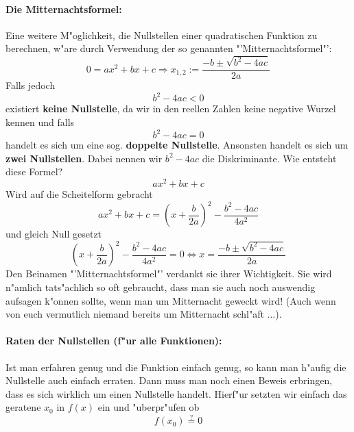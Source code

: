 \paragraph{Die Mitternachtsformel:}
Eine weitere M"oglichkeit, die Nullstellen einer quadratischen Funktion zu berechnen, w"are durch Verwendung der so genannten "'Mitternachtsformel"':
\begin{equation*}
0 = ax^2 + bx + c \Rightarrow x_{1,2} := \frac{-b \pm \sqrt{b^2 - 4ac}}{2a}
\end{equation*}
Falls jedoch 
\begin{equation*}
b^2 - 4ac < 0
\end{equation*}
existiert \textbf{keine Nullstelle}, da wir in den reellen Zahlen keine negative Wurzel kennen und falls
\begin{equation*}
b^2 - 4ac = 0
\end{equation*}
handelt es sich um eine sog. \textbf{doppelte Nullstelle}. Ansonsten handelt es sich um \textbf{zwei Nullstellen}. Dabei nennen wir $b^2 - 4ac$ die Diskriminante.
Wie entsteht diese Formel?
\begin{equation*}
 ax^2 + bx + c 
\end{equation*}
Wird auf die Scheitelform gebracht
\begin{equation*}
 ax^2 + bx + c  = \left(x + \frac{b}{2a} \right)^2 - \frac{b^2-4ac}{4a^2}
\end{equation*}
und gleich Null gesetzt
\begin{equation*}
\left(x + \frac{b}{2a}\right)^2 - \frac{b^2-4ac}{4a^2} = 0 \iff x = \frac{-b \pm \sqrt{b^2 - 4ac}}{2a}
\end{equation*}
Den Beinamen "'Mitternachtsformel"' verdankt sie ihrer Wichtigkeit. Sie wird n"amlich tats"achlich so oft gebraucht, dass man sie auch noch auswendig aufsagen k"onnen sollte, wenn man um Mitternacht geweckt wird! (Auch wenn von euch vermutlich niemand bereits um Mitternacht schl"aft $\ldots$).

\paragraph{Raten der Nullstellen (f"ur alle Funktionen):}
Ist man erfahren genug und die Funktion einfach genug, so kann man h"aufig die Nullstelle auch einfach erraten. Dann muss man noch einen Beweis erbringen, dass es sich wirklich um einen Nullstelle handelt. Hierf"ur setzten wir einfach das geratene $x_0$ in $f(x)$ ein und "uberpr"ufen ob 
\begin{equation*}
f(x_0) \stackrel{?}{=} 0
\end{equation*}

